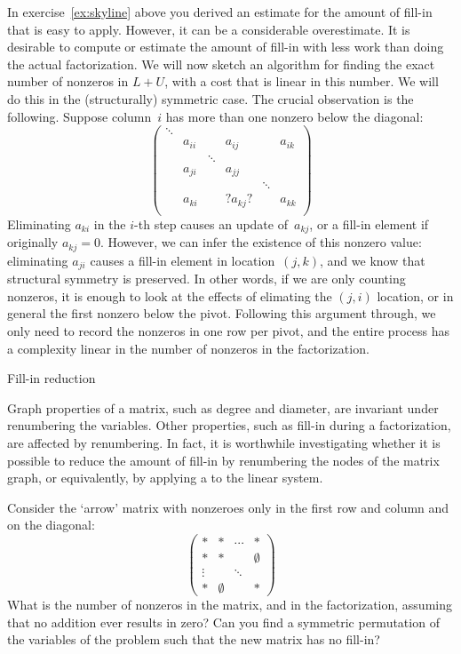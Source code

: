 In exercise~\ref{ex:skyline} above you derived an estimate for the
amount of fill-in that is easy to apply. However, it can be a
considerable overestimate. It is desirable to compute or estimate the
amount of fill-in with less work than doing the actual factorization.
We will now sketch an algorithm for finding the exact
number of nonzeros in $L+U$, with a cost that is linear in this
number. We will do this in the (structurally) symmetric case. The
crucial observation is the following. Suppose column~$i$ has more than
one nonzero below the diagonal:
\[
\begin{pmatrix}
  \ddots\\ &a_{ii}&&a_{ij}&&a_{ik}\\ 
  &&\ddots\\ &a_{ji}&&a_{jj}\\ &&&&\ddots\\
  &a_{ki}&&?a_{kj}?&&a_{kk}\\ 
\end{pmatrix}
\]
Eliminating $a_{ki}$ in the $i$-th step causes an update of~$a_{kj}$,
or a fill-in element if originally $a_{kj}=0$. However, we can infer
the existence of this nonzero value: eliminating $a_{ji}$ causes a
fill-in element in location~$(j,k)$, and we know that structural
symmetry is preserved. In other words, if we are only
counting nonzeros, it is enough to look at the effects of elimating
the $(j,i)$ location, or in general the first nonzero below the
pivot. Following this argument through, we only need to record the
nonzeros in one row per pivot, and the entire process has a complexity
linear in the number of nonzeros in the factorization.


 {Fill-in reduction}
\label{sec:arrow-matrix}

Graph properties of a matrix, such as degree and diameter, are
invariant under renumbering the variables. Other properties, such as
fill-in during a factorization, are affected by renumbering.
In fact, it is worthwhile investigating whether it is possible
to reduce the amount of fill-in by renumbering the nodes of the matrix
graph, or equivalently,
by applying a
 to the linear system.

\begin{exercise}
  Consider the `arrow' matrix with nonzeroes only 
  in the first row and column and on the diagonal:
  \[ 
  \begin{pmatrix}
    *&*&\cdots&*\\ *&*&&\emptyset\\ \vdots&&\ddots\\ *&\emptyset&&*
  \end{pmatrix}
  \]
  What is the number of nonzeros in the matrix, and in the
  factorization, assuming that no addition ever results in zero? Can
  you find a symmetric permutation of the variables of the problem
  such that the new matrix has no fill-in?
\end{exercise}

